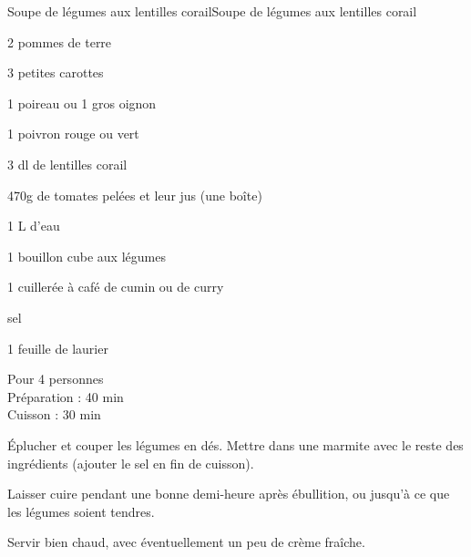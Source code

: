 \begin{recette}{Soupe de légumes aux lentilles corail}{Soupe de légumes aux lentilles corail}

\begin{ingredients}
2 pommes de terre\par
3 petites carottes\par
1 poireau ou 1 gros oignon\par
1 poivron rouge ou vert\par
3 dl de lentilles corail\par
470g de tomates pelées et leur jus (une boîte)\par
1 L d’eau\par
1 bouillon cube aux légumes\par
1 cuillerée à café de cumin ou de curry\par
sel\par
1 feuille de laurier\par
\end{ingredients}

\begin{infos}
Pour 4 personnes\\
Préparation : 40 min\\
Cuisson : 30 min\\
\end{infos}

\begin{etapes}
\item Éplucher et couper les légumes en dés. Mettre dans une marmite avec le reste des ingrédients (ajouter le sel en fin de cuisson).
\item Laisser cuire pendant une bonne demi-heure après ébullition, ou jusqu’à ce que les légumes soient tendres.
\item Servir bien chaud, avec éventuellement un peu de crème fraîche.
\end{etapes}

\end{recette}